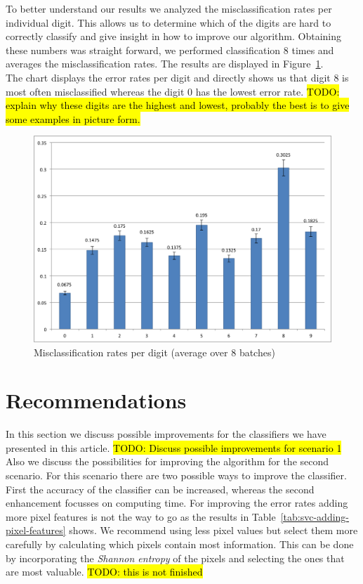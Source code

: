 \documentclass{article}
\newcommand{\todo}[1] {\hl{TODO: #1}}
\begin{document}
To better understand our results we analyzed the misclassification rates per individual digit. This allows us to determine which of the digits are hard to correctly classify and give insight in how to improve our algorithm. Obtaining these numbers was straight forward, we performed classification $8$ times and averages the misclassification rates. The results are displayed in Figure~\ref{fig:digit-misclassification}. \\

The chart displays the error rates per digit and directly shows us that digit $8$ is most often misclassified whereas the digit $0$ has the lowest error rate. \todo{explain why these digits are the highest and lowest, probably the best is to give some examples in picture form.}

\begin{figure}[H]
    \center
    \includegraphics[width=.7\textwidth]{misclassification-digits}
    \caption{Misclassification rates per digit (average over $8$ batches) \label{fig:digit-misclassification}}
\end{figure}

\section{Recommendations}

In this section we discuss possible improvements for the classifiers we have presented in this article. \todo{Discuss possible improvements for scenario 1} \\

Also we discuss the possibilities for improving the algorithm for the second scenario. For this scenario there are two possible ways to improve the classifier. First the accuracy of the classifier can be increased, whereas the second enhancement focusses on computing time. For improving the error rates adding more pixel features is not the way to go as the results in Table~\ref{tab:svc-adding-pixel-features} shows. We recommend using less pixel values but select them more carefully by calculating which pixels contain most information. This can be done by incorporating the \emph{Shannon entropy} of the pixels and selecting the ones that are most valuable. \todo{this is not finished}
\end{document}
